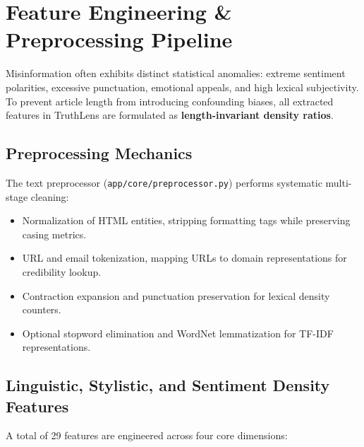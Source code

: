\documentclass[11pt,a4paper]{article}
\begin{document}
\section{Feature Engineering \& Preprocessing Pipeline}

Misinformation often exhibits distinct statistical anomalies: extreme sentiment polarities, excessive punctuation, emotional appeals, and high lexical subjectivity. To prevent article length from introducing confounding biases, all extracted features in TruthLens are formulated as \textbf{length-invariant density ratios}.

\subsection{Preprocessing Mechanics}
The text preprocessor (\texttt{app/core/preprocessor.py}) performs systematic multi-stage cleaning:
\begin{itemize}[noitemsep]
    \item Normalization of HTML entities, stripping formatting tags while preserving casing metrics.
    \item URL and email tokenization, mapping URLs to domain representations for credibility lookup.
    \item Contraction expansion and punctuation preservation for lexical density counters.
    \item Optional stopword elimination and WordNet lemmatization for TF-IDF representations.
\end{itemize}

\subsection{Linguistic, Stylistic, and Sentiment Density Features}
A total of 29 features are engineered across four core dimensions:
\end{document}
